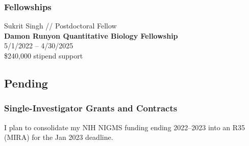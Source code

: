 \documentclass[10pt]{article}
\begin{document}
\vspace{-0.1in} 

\subsubsection*{Fellowships}

Sukrit Singh // Postdoctoral Fellow \\
{\bf Damon Runyon Quantitative Biology Fellowship}\\
5/1/2022 -- 4/30/2025\\
\$240,000 stipend support


\eject
\subsection*{Pending}

\subsubsection*{Single-Investigator Grants and Contracts}

I plan to consolidate my NIH NIGMS funding ending 2022--2023 into an R35 (MIRA) for the Jan 2023 deadline.


%
%
%
\end{document}
